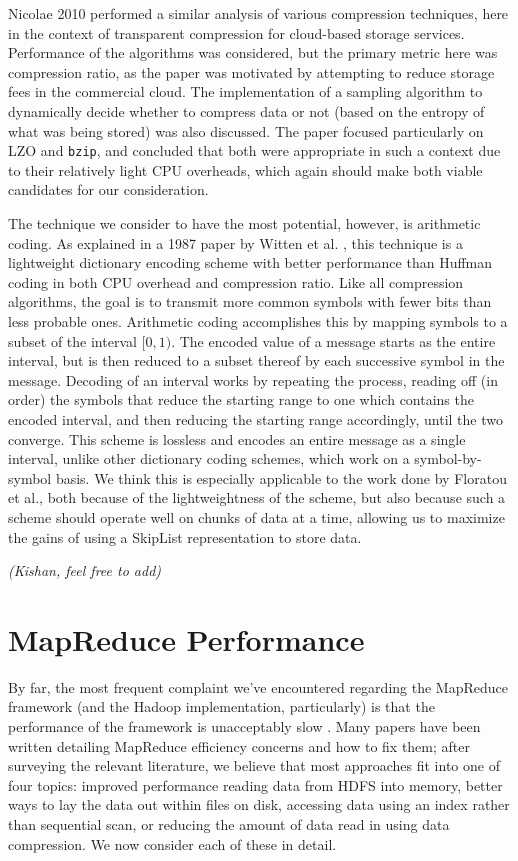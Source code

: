 \documentclass[twocolumn]{article}
\begin{document}
Nicolae 2010 \cite{ref:cloud-comp} performed a similar analysis of various
compression techniques, here in the context of transparent compression
for cloud-based storage services.  Performance of the algorithms
was considered, but the primary metric here was compression ratio, as the
paper was motivated by attempting to reduce storage fees in the commercial
cloud.  The implementation of a sampling algorithm to dynamically decide whether
to compress data or not (based on the entropy of what was being stored) was also
discussed.  The paper focused particularly on LZO and \verb+bzip+,
and concluded that both were appropriate in such a context due to their
relatively light CPU overheads, which again should make both viable candidates
for our consideration.

The technique we consider to have the most potential, however, is arithmetic
coding.  As explained in a 1987 paper by Witten et al. \cite{ref:arith}, this
technique is a lightweight dictionary encoding scheme with better performance
than Huffman coding \cite{ref:huffman} in both CPU overhead and compression ratio. 
Like all compression algorithms, the goal is to transmit more common symbols
with fewer bits than less probable ones.  Arithmetic coding accomplishes
this by mapping symbols to a subset of the interval $ [0, 1) $.  The encoded
value of a message starts as the entire interval, but is then
reduced to a subset thereof by each successive symbol in the message.
Decoding of an interval works by repeating the process, reading off (in order)
the symbols that reduce the starting range to one which contains the encoded
interval, and then reducing the starting range accordingly, until the two
converge.  This scheme is lossless and encodes an entire message as a single
interval, unlike other dictionary coding schemes, which work on a
symbol-by-symbol basis.  We think this is especially applicable to the
work done by Floratou et al., both because of the lightweightness of the
scheme, but also because such a scheme should operate well on chunks of data
at a time, allowing us to maximize the gains of using a SkipList representation
to store data.

\emph{(Kishan, feel free to add)}

\section{MapReduce Performance}

By far, the most frequent complaint we've encountered regarding the MapReduce
framework (and the Hadoop implementation, particularly) is that the performance
of the framework is unacceptably slow \cite{ref:friends-or-foes}.  Many papers
have been written detailing
MapReduce efficiency concerns and how to fix them; after surveying the relevant literature,
we believe that most approaches fit into one of four topics: improved performance reading
data from HDFS into memory, better ways to lay the data out within files on disk,
accessing data using an index rather than sequential scan, or reducing the
amount of data read in using data compression.  We now consider each
of these in detail.
\end{document}
